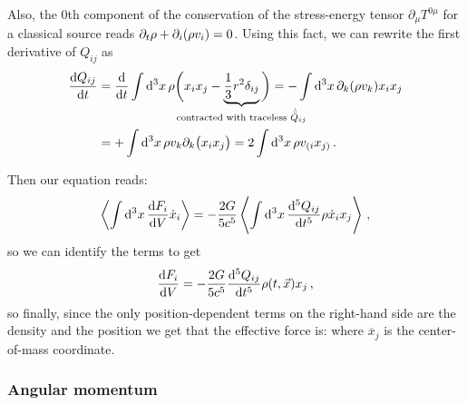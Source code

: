 \documentclass[main.tex]{subfiles}
\begin{document}
Also, the 0th component of the conservation of the stress-energy tensor \(\partial_{\mu } T^{0 \mu }\) for a classical source reads \(\partial_{t} \rho + \partial_{i} \qty(\rho v_i) = 0 \). Using this fact, we can rewrite the first derivative of \(Q_{ij}\) as 
%
\begin{align}
\dv{Q_{ij}}{t} &= \dv{}{t} \int  \dd[3]{x} 
\rho \bigg( x_{i} x_{j} - \underbrace{\frac{1}{3} r^2 \delta_{ij}}_{\mathclap{\text{contracted with traceless \(\dot{\ddot{\ddot{Q}}}_{ij}\)}}}\bigg) 
= - \int \dd[3]{x} \partial_{k} \qty(\rho v_k) 
 x_{i} x_{j}  \\
&= + \int \dd[3]{x} \rho v_k \partial_{k} \qty(x_i x_j) = 
2 \int \dd[3]{x} \rho v_{(i } x_{j)}
\,.
\end{align}
%

Then our equation reads: 
%
\begin{align}
\expval{\int \dd[3]{x} \dv{F_i}{V} \dot{x}_{i}} = - \frac{2G}{5c^{5}}\expval{\int \dd[3]{x} \dv[5]{Q_{ij}}{t} \rho \dot{x}_{i} x_{j}}
\,,
\end{align}
%
so we can identify the terms to get
%
\begin{align}
\dv{F_{i}}{V} = - \frac{2G}{5c^{5}} \dv[5]{Q_{ij}}{t} \rho (t, \vec{x}) x_{j}
\,,
\end{align}
%
so finally, since the only position-dependent terms on the right-hand side are the density and the position we get that the effective force is: 
%
%
where \(\overline{x}_{j} \) is the center-of-mass coordinate. 

\subsubsection{Angular momentum}
\end{document}
